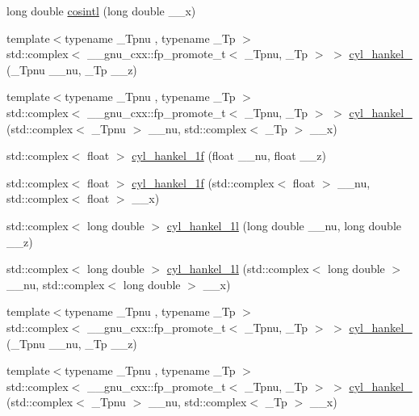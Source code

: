 \begin{DoxyCompactItemize}
\item 
long double \hyperlink{group__gnu__math__spec__func_ga5f01f17ae8859129860118b09d51791c}{cosintl} (long double \+\_\+\+\_\+x)
\item 
{\footnotesize template$<$typename \+\_\+\+Tpnu , typename \+\_\+\+Tp $>$ }\\std\+::complex$<$ \+\_\+\+\_\+gnu\+\_\+cxx\+::fp\+\_\+promote\+\_\+t$<$ \+\_\+\+Tpnu, \+\_\+\+Tp $>$ $>$ \hyperlink{group__gnu__math__spec__func_ga5329bba77d10a9d2f15d9bbe43a70db3}{cyl\+\_\+hankel\+\_} (\+\_\+\+Tpnu \+\_\+\+\_\+nu, \+\_\+\+Tp \+\_\+\+\_\+z)
\item 
{\footnotesize template$<$typename \+\_\+\+Tpnu , typename \+\_\+\+Tp $>$ }\\std\+::complex$<$ \+\_\+\+\_\+gnu\+\_\+cxx\+::fp\+\_\+promote\+\_\+t$<$ \+\_\+\+Tpnu, \+\_\+\+Tp $>$ $>$ \hyperlink{group__gnu__math__spec__func_ga2f111212d3ec713625acb6986daa925f}{cyl\+\_\+hankel\+\_} (std\+::complex$<$ \+\_\+\+Tpnu $>$ \+\_\+\+\_\+nu, std\+::complex$<$ \+\_\+\+Tp $>$ \+\_\+\+\_\+x)
\item 
std\+::complex$<$ float $>$ \hyperlink{group__gnu__math__spec__func_ga89758ed03e56567baa62b90cc4784f71}{cyl\+\_\+hankel\+\_\+1f} (float \+\_\+\+\_\+nu, float \+\_\+\+\_\+z)
\item 
std\+::complex$<$ float $>$ \hyperlink{group__gnu__math__spec__func_ga810e021a3f11c1b2253c15c6f4d41143}{cyl\+\_\+hankel\+\_\+1f} (std\+::complex$<$ float $>$ \+\_\+\+\_\+nu, std\+::complex$<$ float $>$ \+\_\+\+\_\+x)
\item 
std\+::complex$<$ long double $>$ \hyperlink{group__gnu__math__spec__func_gacb49c66b4267fbc56906db02f14365f2}{cyl\+\_\+hankel\+\_\+1l} (long double \+\_\+\+\_\+nu, long double \+\_\+\+\_\+z)
\item 
std\+::complex$<$ long double $>$ \hyperlink{group__gnu__math__spec__func_ga6900f79ec70673bcb001538aec74e07c}{cyl\+\_\+hankel\+\_\+1l} (std\+::complex$<$ long double $>$ \+\_\+\+\_\+nu, std\+::complex$<$ long double $>$ \+\_\+\+\_\+x)
\item 
{\footnotesize template$<$typename \+\_\+\+Tpnu , typename \+\_\+\+Tp $>$ }\\std\+::complex$<$ \+\_\+\+\_\+gnu\+\_\+cxx\+::fp\+\_\+promote\+\_\+t$<$ \+\_\+\+Tpnu, \+\_\+\+Tp $>$ $>$ \hyperlink{group__gnu__math__spec__func_ga7ebc71dd48ac97255d72f5f5f43dfd8e}{cyl\+\_\+hankel\+\_} (\+\_\+\+Tpnu \+\_\+\+\_\+nu, \+\_\+\+Tp \+\_\+\+\_\+z)
\item 
{\footnotesize template$<$typename \+\_\+\+Tpnu , typename \+\_\+\+Tp $>$ }\\std\+::complex$<$ \+\_\+\+\_\+gnu\+\_\+cxx\+::fp\+\_\+promote\+\_\+t$<$ \+\_\+\+Tpnu, \+\_\+\+Tp $>$ $>$ \hyperlink{group__gnu__math__spec__func_ga326764c0d2dca072c411573503968e50}{cyl\+\_\+hankel\+\_} (std\+::complex$<$ \+\_\+\+Tpnu $>$ \+\_\+\+\_\+nu, std\+::complex$<$ \+\_\+\+Tp $>$ \+\_\+\+\_\+x)

\end{DoxyCompactItemize}
